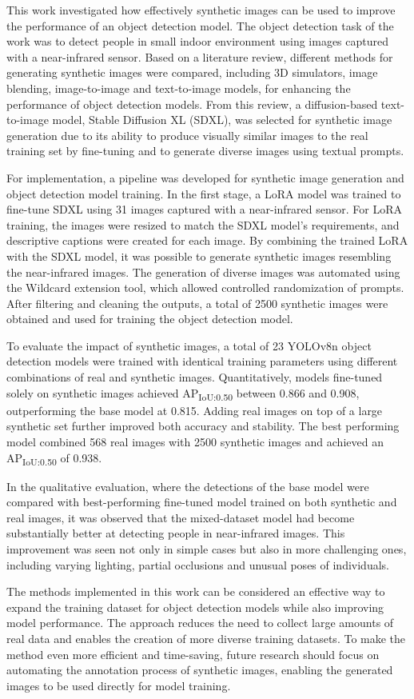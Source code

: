 This work investigated how effectively synthetic images can be used to improve the performance of an object detection model. The object detection task of the work was to detect people in small indoor environment using images captured with a near-infrared sensor. Based on a literature review, different methods for generating synthetic images were compared, including 3D simulators, image blending, image-to-image and text-to-image models, for enhancing the performance of object detection models. From this review, a diffusion-based text-to-image model, Stable Diffusion XL (SDXL), was selected for synthetic image generation due to its ability to produce visually similar images to the real training set by fine-tuning and to generate diverse images using textual prompts.

For implementation, a pipeline was developed for synthetic image generation and object detection model training. In the first stage, a LoRA model was trained to fine-tune SDXL using 31 images captured with a near-infrared sensor. For LoRA training, the images were resized to match the SDXL model's requirements, and descriptive captions were created for each image. By combining the trained LoRA with the SDXL model, it was possible to generate synthetic images resembling the near-infrared images. The generation of diverse images was automated using the Wildcard extension tool, which allowed controlled randomization of prompts. After filtering and cleaning the outputs, a total of 2500 synthetic images were obtained and used for training the object detection model.

To evaluate the impact of synthetic images, a total of 23 YOLOv8n object detection models were trained with identical training parameters using different combinations of real and synthetic images. Quantitatively, models fine-tuned solely on synthetic images achieved AP\textsubscript{IoU:0.50} between 0.866 and 0.908, outperforming the base model at 0.815. Adding real images on top of a large synthetic set further improved both accuracy and stability. The best performing model combined 568 real images with 2500 synthetic images and achieved an AP\textsubscript{IoU:0.50} of 0.938.

In the qualitative evaluation, where the detections of the base model were compared with best-performing fine-tuned model trained on both synthetic and real images, it was observed that the mixed-dataset model had become substantially better at detecting people in near-infrared images. This improvement was seen not only in simple cases but also in more challenging ones, including varying lighting, partial occlusions and unusual poses of individuals.

The methods implemented in this work can be considered an effective way to expand the training dataset for object detection models while also improving model performance. The approach reduces the need to collect large amounts of real data and enables the creation of more diverse training datasets. To make the method even more efficient and time-saving, future research should focus on automating the annotation process of synthetic images, enabling the generated images to be used directly for model training.

